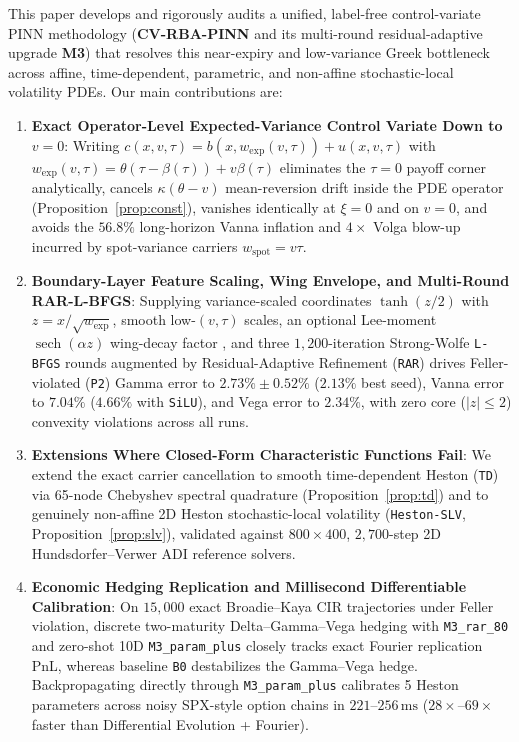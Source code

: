 \documentclass[preprint,12pt]{elsarticle}
\begin{document}
This paper develops and rigorously audits a unified, label-free control-variate PINN methodology (\textbf{CV-RBA-PINN} and its multi-round residual-adaptive upgrade \textbf{M3}) that resolves this near-expiry and low-variance Greek bottleneck across affine, time-dependent, parametric, and non-affine stochastic-local volatility PDEs. Our main contributions are:
\begin{enumerate}
  \item \textbf{Exact Operator-Level Expected-Variance Control Variate Down to $v = 0$}: Writing $c(x,v,\tau) = b(x, w_{\mathrm{exp}}(v,\tau)) + u(x,v,\tau)$ with $w_{\mathrm{exp}}(v,\tau) = \theta(\tau - \beta(\tau)) + v\beta(\tau)$ eliminates the $\tau = 0$ payoff corner analytically, cancels $\kappa(\theta - v)$ mean-reversion drift inside the PDE operator (Proposition~\ref{prop:const}), vanishes identically at $\xi = 0$ and on $v = 0$, and avoids the $56.8\%$ long-horizon Vanna inflation and $4\times$ Volga blow-up incurred by spot-variance carriers $w_{\mathrm{spot}} = v\tau$.
  \item \textbf{Boundary-Layer Feature Scaling, Wing Envelope, and Multi-Round RAR-L-BFGS}: Supplying variance-scaled coordinates $\tanh(z/2)$ with $z = x/\sqrt{w_{\mathrm{exp}}}$, smooth low-$(v,\tau)$ scales, an optional Lee-moment $\operatorname{sech}(\alpha z)$ wing-decay factor \cite{lee2004moment}, and three $1{,}200$-iteration Strong-Wolfe \texttt{L-BFGS} rounds augmented by Residual-Adaptive Refinement (\texttt{RAR}) \cite{lu2021deepxde} drives Feller-violated (\texttt{P2}) Gamma error to $2.73\% \pm 0.52\%$ ($2.13\%$ best seed), Vanna error to $7.04\%$ ($4.66\%$ with \texttt{SiLU}), and Vega error to $2.34\%$, with zero core ($|z|\le 2$) convexity violations across all runs.
  \item \textbf{Extensions Where Closed-Form Characteristic Functions Fail}: We extend the exact carrier cancellation to smooth time-dependent Heston (\texttt{TD}) via 65-node Chebyshev spectral quadrature (Proposition~\ref{prop:td}) and to genuinely non-affine 2D Heston stochastic-local volatility (\texttt{Heston-SLV}, Proposition~\ref{prop:slv}), validated against $800\times 400$, $2{,}700$-step 2D Hundsdorfer--Verwer ADI reference solvers.
  \item \textbf{Economic Hedging Replication and Millisecond Differentiable Calibration}: On $15{,}000$ exact Broadie--Kaya CIR trajectories \cite{broadie2006exact} under Feller violation, discrete two-maturity Delta--Gamma--Vega hedging with \texttt{M3\_rar\_80} and zero-shot 10D \texttt{M3\_param\_plus} closely tracks exact Fourier replication PnL, whereas baseline \texttt{B0} destabilizes the Gamma--Vega hedge. Backpropagating directly through \texttt{M3\_param\_plus} calibrates 5 Heston parameters across noisy SPX-style option chains in $221\text{--}256\,\mathrm{ms}$ ($28\times\text{--}69\times$ faster than Differential Evolution + Fourier).
\end{enumerate}
\end{document}
